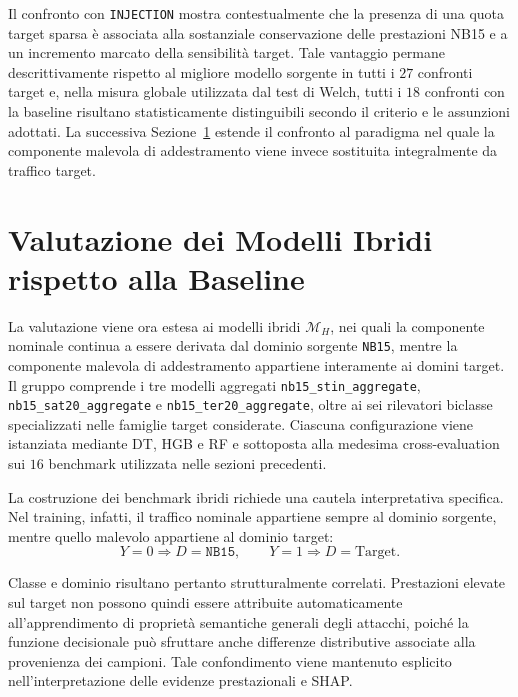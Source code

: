 Il confronto con \texttt{INJECTION} mostra contestualmente che la presenza di una quota target sparsa è associata alla sostanziale conservazione delle prestazioni NB15 e a un incremento marcato della sensibilità target. 
Tale vantaggio permane descrittivamente rispetto al migliore modello sorgente in tutti i $27$ confronti target e, nella misura globale utilizzata dal test di Welch, tutti i $18$ confronti con la baseline risultano statisticamente distinguibili secondo il criterio e le assunzioni adottati. 
La successiva Sezione~\ref{sec:risultati_modelli_ibridi} estende il confronto al paradigma nel quale la componente malevola di addestramento viene invece sostituita integralmente da traffico target.




\section{Valutazione dei Modelli Ibridi rispetto alla Baseline}
\label{sec:risultati_modelli_ibridi}

La valutazione viene ora estesa ai modelli ibridi $\mathcal{M}_{H}$, nei quali la componente nominale continua a essere derivata dal dominio sorgente \texttt{NB15}, mentre la componente malevola di addestramento appartiene interamente ai domini target. 
Il gruppo comprende i tre modelli aggregati \texttt{nb15\_stin\_aggregate}, \texttt{nb15\_sat20\_aggregate} e \texttt{nb15\_ter20\_aggregate}, oltre ai sei rilevatori biclasse specializzati nelle famiglie target considerate. 
Ciascuna configurazione viene istanziata mediante DT, HGB e RF e sottoposta alla medesima cross-evaluation sui $16$ benchmark utilizzata nelle sezioni precedenti.

La costruzione dei benchmark ibridi richiede una cautela interpretativa specifica. 
Nel training, infatti, il traffico nominale appartiene sempre al dominio sorgente, mentre quello malevolo appartiene al dominio target:
\[
    Y=0 \Rightarrow D=\texttt{NB15},
    \qquad
    Y=1 \Rightarrow D=\text{Target}.
\]

Classe e dominio risultano pertanto strutturalmente correlati. 
Prestazioni elevate sul target non possono quindi essere attribuite automaticamente all'apprendimento di proprietà semantiche generali degli attacchi, poiché la funzione decisionale può sfruttare anche differenze distributive associate alla provenienza dei campioni. 
Tale confondimento viene mantenuto esplicito nell'interpretazione delle evidenze prestazionali e SHAP.


